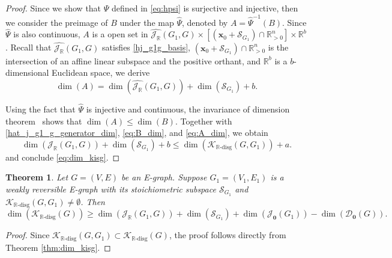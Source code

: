 \documentclass[11pt]{article}
\theoremstyle{plain}
\newtheorem{theorem}{Theorem}[section]
\theoremstyle{definition}
\theoremstyle{remark}
\newcommand\RR{\mathbb{R}}
\newcommand\bx{\boldsymbol{x}}
\newcommand{\dK}{\mathcal{K}_{\RR\text{-disg}}}
\newcommand{\mJ}{\mathcal{J}_{\RR}}
\newcommand{\eJ}{\mathcal{J}_{\textbf{0}}}
\newcommand{\mD}{\mathcal{D}_{\textbf{0}}}
\newcommand{\mS}{\mathcal{S}}
\begin{document}
\begin{proof}
Since we show that $\hat{\Psi}$ defined in \eqref{eq:hpsi} is surjective and injective, then we consider the preimage of $B$ under the map $\hat{\Psi}$, denoted by $A = \hat{\Psi}^{-1} (B)$. Since $\hat{\Psi}$ is also continuous, $A$ is a open set in $\hat{\mJ} (G_1,G) \times [(\bx_0 + \mS_{G_1} )\cap\mathbb{R}^n_{>0}] \times \RR^b$. 
Recall that $\hat{\mJ} (G_1, G)$ satisfies \eqref{hj_g1g_basis},
$(\bx_0 + \mS_{G_1} )\cap\mathbb{R}^n_{>0}$ is the intersection of an affine linear subspace and the positive orthant, and $\RR^b$ is a $b$-dimensional Euclidean space, we derive 
\begin{equation} \label{eq:A_dim}
\dim (A) = \dim (\hat{\mJ} (G_1, G)) + \dim (\mS_{G_1}) + b.
\end{equation}

Using the fact that $\hat{\Psi}$ is injective and continuous, the invariance of dimension theorem~\cite{hatcher2005algebraic,munkres2018elements} shows that $\dim (A) \leq \dim (B)$.
Together with \eqref{hat_j_g1_g_generator_dim}, \eqref{eq:B_dim}, and \eqref{eq:A_dim}, we obtain
\begin{equation}
\dim (\mJ (G_1, G)) + \dim (\mS_{G_1}) + b
\leq \dim (\dK(G, G_1)) + a.
\end{equation}
and conclude \eqref{eq:dim_kisg}.
\end{proof}

\begin{theorem}
\label{thm:dim_kisg 2}
Let $G = (V, E)$ be an E-graph. 
Suppose $G_1 = (V_1, E_1)$ is a weakly reversible E-graph
with its stoichiometric subspace $\mS_{G_1}$ and $\dK(G,G_1) \neq \emptyset$. Then 
\[
\dim (\dK(G)) \geq \dim (\mJ(G_1,G)) + \dim (\mS_{G_1}) + \dim(\eJ(G_1)) - \dim(\mD(G)).
\]
\end{theorem}

\begin{proof}
Since $\dK(G, G_1) \subset \dK(G)$, the proof follows directly from Theorem \ref{thm:dim_kisg}.
\end{proof}
\end{document}
